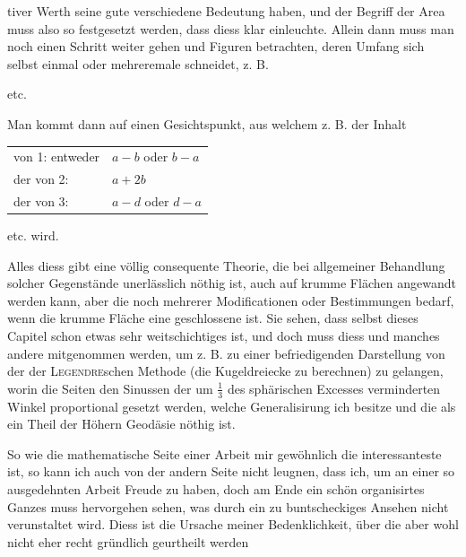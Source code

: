 %
tiver Werth seine gute verschiedene Bedeutung haben, und der Begriff der Area muss also so festgesetzt werden, dass diess klar einleuchte. Allein dann muss man noch einen Schritt weiter gehen und Figuren betrachten, deren Umfang sich selbst einmal oder mehreremale schneidet, z. B.
\begin{center}
\quad\quad\quad etc.
\end{center}
\noindent Man kommt dann auf einen Gesichtspunkt, aus welchem z. B. der Inhalt
\begin{center}\begin{tabular}{ll}
von 1: entweder &$a-b$ oder $b-a$\\
der von 2: &$a+2b$\\
der von 3: &$a-d$ oder $d-a$
\end{tabular}\end{center}
\noindent etc. wird.

Alles diess gibt eine völlig consequente Theorie, die bei allgemeiner Behandlung solcher Gegenstände unerlässlich nöthig ist, auch auf krumme Flächen angewandt werden kann, aber die noch mehrerer Modificationen oder Bestimmungen bedarf, wenn die krumme Fläche eine geschlossene ist. Sie sehen, dass selbst dieses Capitel schon etwas sehr weitschichtiges ist, und doch muss diess und manches andere mitgenommen werden, um z. B. zu einer befriedigenden Darstellung von der  der \textsc{Legendre}schen Methode (die Kugeldreiecke zu berechnen) zu gelangen, worin die Seiten den Sinussen der um $\frac13$ des sphärischen Excesses verminderten Winkel proportional gesetzt werden, welche Generalisirung ich besitze und die als ein Theil der Höhern Geodäsie nöthig ist.

So wie die mathematische Seite einer Arbeit mir gewöhnlich die interessanteste ist, so kann ich auch von der andern Seite nicht leugnen, dass ich, um an einer so ausgedehnten Arbeit Freude zu haben, doch am Ende ein schön organisirtes Ganzes muss hervorgehen sehen, was durch ein zu buntscheckiges Ansehen nicht verunstaltet wird. Diess ist die Ursache meiner Bedenklichkeit, über die aber wohl nicht eher recht gründlich geurtheilt werden
